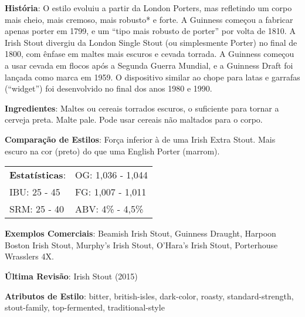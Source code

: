 \textbf{História}: O estilo evoluiu a partir da London Porters, mas refletindo um corpo mais cheio, mais cremoso, mais robusto* e forte. A Guinness começou a fabricar apenas porter em 1799, e um “tipo mais robusto de porter” por volta de 1810. A Irish Stout divergiu da London Single Stout (ou simplesmente Porter) no final de 1800, com ênfase em maltes mais escuros e cevada torrada. A Guinness começou a usar cevada em flocos após a Segunda Guerra Mundial, e a Guinness Draft foi lançada como marca em 1959. O dispositivo similar ao chope para latas e garrafas (“widget”) foi desenvolvido no final dos anos 1980 e 1990.

\textbf{Ingredientes}: Maltes ou cereais torrados escuros, o suficiente para tornar a cerveja preta. Malte pale. Pode usar cereais não maltados para o corpo.

\textbf{Comparação de Estilos}: Força inferior à de uma Irish Extra Stout. Mais escuro na cor (preto) do que uma English Porter (marrom).

\begin{tabular}{@{}p{35mm}p{35mm}@{}}
  \textbf{Estatísticas}: & OG: 1,036 - 1,044 \\
  IBU: 25 - 45  & FG: 1,007 - 1,011 \\
  SRM: 25 - 40  & ABV: 4\% - 4,5\%
\end{tabular}

\textbf{Exemplos Comerciais}: Beamish Irish Stout, Guinness Draught, Harpoon Boston Irish Stout, Murphy's Irish Stout, O'Hara's Irish Stout, Porterhouse Wrasslers 4X.

\textbf{Última Revisão}: Irish Stout (2015)

\textbf{Atributos de Estilo}: bitter, british-isles, dark-color, roasty, standard-strength, stout-family, top-fermented, traditional-style
